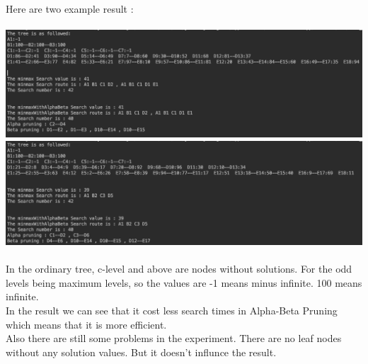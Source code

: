 \documentclass{article}
\begin{document}
Here are two example result : \\\\
\includegraphics[scale=0.365]{output2-1.png}\\
\includegraphics[scale=0.365]{output2-2.png}\\\\

In the ordinary tree, c-level and above are nodes without solutions. For the odd levels being maximum levels, so the values are -1 means minus infinite. 100 means infinite.\\

In the result we can see that it cost less search times in Alpha-Beta Pruning which means that it is more efficient.\\

Also there are still some problems in the experiment. There are no leaf nodes without any solution values. But it doesn't influnce the result.

\newpage
\end{document}
